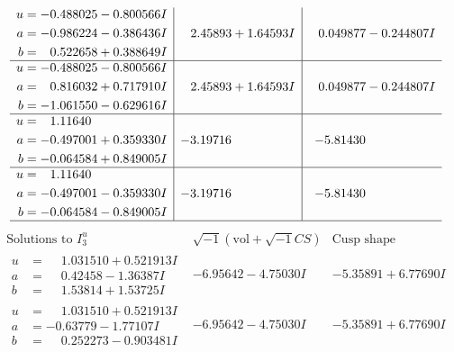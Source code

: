 \documentclass[1p]{elsarticle_modified}
\theoremstyle{definition}
\newcommand{\I}{\sqrt{-1}}
\begin{document}
$$\begin{array}{c|c|c}
\begin{aligned}
u &= -0.488025 - 0.800566 I \\
a &= -0.986224 - 0.386436 I \\
b &= \phantom{-}0.522658 + 0.388649 I\end{aligned}
 & \phantom{-}2.45893 + 1.64593 I & \phantom{-}0.049877 - 0.244807 I \\ \hline\begin{aligned}
u &= -0.488025 - 0.800566 I \\
a &= \phantom{-}0.816032 + 0.717910 I \\
b &= -1.061550 - 0.629616 I\end{aligned}
 & \phantom{-}2.45893 + 1.64593 I & \phantom{-}0.049877 - 0.244807 I \\ \hline\begin{aligned}
u &= \phantom{-}1.11640\phantom{ +0.000000I} \\
a &= -0.497001 + 0.359330 I \\
b &= -0.064584 + 0.849005 I\end{aligned}
 & -3.19716\phantom{ +0.000000I} & -5.81430\phantom{ +0.000000I} \\ \hline\begin{aligned}
u &= \phantom{-}1.11640\phantom{ +0.000000I} \\
a &= -0.497001 - 0.359330 I \\
b &= -0.064584 - 0.849005 I\end{aligned}
 & -3.19716\phantom{ +0.000000I} & -5.81430\phantom{ +0.000000I}\\
 \hline 
 \end{array}$$\newpage$$\begin{array}{c|c|c}  
\text{Solutions to }I^u_{3}& \I (\text{vol} + \sqrt{-1}CS) & \text{Cusp shape}\\
 \hline 
\begin{aligned}
u &= \phantom{-}1.031510 + 0.521913 I \\
a &= \phantom{-}0.42458 - 1.36387 I \\
b &= \phantom{-}1.53814 + 1.53725 I\end{aligned}
 & -6.95642 - 4.75030 I & -5.35891 + 6.77690 I \\ \hline\begin{aligned}
u &= \phantom{-}1.031510 + 0.521913 I \\
a &= -0.63779 - 1.77107 I \\
b &= \phantom{-}0.252273 - 0.903481 I\end{aligned}
 & -6.95642 - 4.75030 I & -5.35891 + 6.77690 I \\ \hline\begin{aligned}

\end{aligned}
\end{array}$$
\end{document}
